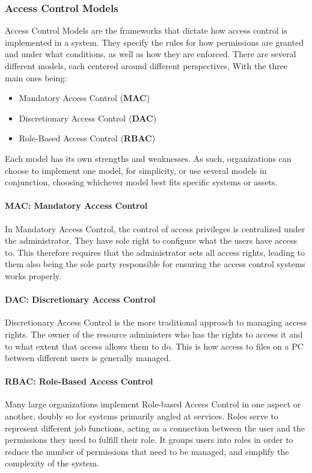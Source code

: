 \subsubsection{Access Control Models}
Access Control Models are the frameworks that dictate how access control is implemented in a system. They specify the rules for how permissions are granted and under what conditions, as well as how they are enforced. There are several different models, each centered around different perspectives, With the three main ones being:\citep{RountreeDerrick2010SfMW}

\begin{itemize}
	\item Mandatory Access Control (\textbf{MAC})
	\item Discretionary Access Control (\textbf{DAC})
	\item Role-Based Access Control (\textbf{RBAC})
\end{itemize}

Each model has its own strengths and weaknesses. As such, organizations can choose to implement one model, for simplicity, or use several models in conjunction, choosing whichever model best fits specific systems or assets.

\paragraph{MAC: Mandatory Access Control}
In Mandatory Access Control, the control of access privileges is centralized under the administrator. They have sole right to configure what the users have access to. This therefore requires that the administrator sets all access rights, leading to them also being the sole party responsible for ensuring the access control systems works properly.

\paragraph{DAC: Discretionary Access Control}
Discretionary Access Control is the more traditional approach to managing access rights. The owner of the resource administers who has the rights to access it and to what extent that access allows them to do. This is how access to files on a PC between different users is generally managed.

\paragraph{RBAC: Role-Based Access Control}
Many large organizations implement Role-based Access Control in one aspect or another\citep{RoleEngMethStd}, doubly so for systems primarily angled at services\citep{FormNormRBAC2009}. Roles serve to represent different job functions, acting as a connection between the user and the permissions they need to fulfill their role. It groups users into roles in order to reduce the number of permissions that need to be managed, and simplify the complexity of the system.


